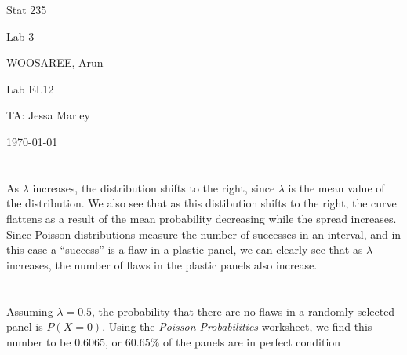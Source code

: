 \documentclass[letterpaper]{article}
\begin{document}
\begin{titlepage}
 \begin{center}
  \vspace*{1cm}
  \Huge
  Stat 235
  \vspace{1cm}
  
  Lab 3
  \vspace{1cm}
  
  WOOSAREE, Arun
  \vspace{1cm}
  
  \Huge
  Lab EL12
  \vspace{1cm}
  
  TA: Jessa Marley
  \vspace{1cm}
  
  \today
  \vfill
 \end{center}
\end{titlepage}

\section{}%
As $\lambda$ increases, the distribution shifts to the right, since $\lambda$ is
the mean value of the distribution. We also see that as this distibution shifts
to the right, the curve flattens as a result of the mean probability decreasing
while the spread increases. Since Poisson distributions measure the number of
successes in an interval, and in this case a ``success'' is a flaw in a plastic
panel, we can clearly see that as $\lambda$ increases, the number of flaws in
the plastic panels also increase.

\section{}%

\subsection{}%
Assuming $\lambda=0.5$, the probability that there are no flaws in a randomly
selected panel is $P(X=0)$. Using the \textit{Poisson Probabilities} worksheet,
we find this number to be $0.6065$, or $60.65\%$ of the panels are in perfect
condition
\end{document}
